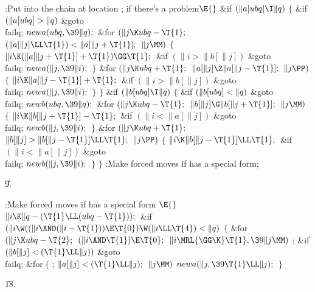 \Y\B\4:Put  into the chain at location ;  if there's a problem\X${}\E{}$\6
\&{if} ${}(\|a[\\{ubq}]\I\|q){}$\5
${}\{{}$\1\6
\&{if} ${}(\|a[\\{ubq}]>\|q){}$\1\5
\&{goto} \\{failq};\2\6
${}\\{newa}(\\{ubq},\39\|q);{}$\6
\&{for} ${}(\|j\K\\{ubq}-\T{1};{}$ ${}(\|a[\|j]\LL\T{1})<\|a[\|j+\T{1}];{}$ ${}%
\|j\MM){}$\5
${}\{{}$\1\6
${}\|i\K(\|a[\|j+\T{1}]+\T{1})\GG\T{1};{}$\6
\&{if} ${}(\|i>\|b[\|j]){}$\1\5
\&{goto} \\{failq};\2\6
${}\\{newa}(\|j,\39\|i);{}$\6
\4${}\}{}$\2\6
\&{for} ${}(\|j\K\\{ubq}+\T{1};{}$ ${}\|a[\|j]\Z\|a[\|j-\T{1}];{}$ ${}\|j%
\PP){}$\5
${}\{{}$\1\6
${}\|i\K\|a[\|j-\T{1}]+\T{1};{}$\6
\&{if} ${}(\|i>\|b[\|j]){}$\1\5
\&{goto} \\{failq};\2\6
${}\\{newa}(\|j,\39\|i);{}$\6
\4${}\}{}$\2\6
\4${}\}{}$\2\6
\&{if} ${}(\|b[\\{ubq}]\I\|q){}$\5
${}\{{}$\1\6
\&{if} ${}(\|b[\\{ubq}]<\|q){}$\1\5
\&{goto} \\{failq};\2\6
${}\\{newb}(\\{ubq},\39\|q);{}$\6
\&{for} ${}(\|j\K\\{ubq}-\T{1};{}$ ${}\|b[\|j]\G\|b[\|j+\T{1}];{}$ ${}\|j%
\MM){}$\5
${}\{{}$\1\6
${}\|i\K\|b[\|j+\T{1}]-\T{1};{}$\6
\&{if} ${}(\|i<\|a[\|j]){}$\1\5
\&{goto} \\{failq};\2\6
${}\\{newb}(\|j,\39\|i);{}$\6
\4${}\}{}$\2\6
\&{for} ${}(\|j\K\\{ubq}+\T{1};{}$ ${}\|b[\|j]>\|b[\|j-\T{1}]\LL\T{1};{}$ ${}%
\|j\PP){}$\5
${}\{{}$\1\6
${}\|i\K\|b[\|j-\T{1}]\LL\T{1};{}$\6
\&{if} ${}(\|i<\|a[\|j]){}$\1\5
\&{goto} \\{failq};\2\6
${}\\{newb}(\|j,\39\|i);{}$\6
\4${}\}{}$\2\6
\4${}\}{}$\2\6
:Make forced moves if  has a special form\X;\par
\U9.\fi

\B{}:Make forced moves if  has a special form%
\X${}\E{}$\6
$\|i\K\|q-(\T{1}\LL(\\{ubq}-\T{1}));{}$\6
\&{if} ${}(\|i\W((\|i\AND(\|i-\T{1}))\E\T{0})\W(\|i\LL\T{4})<\|q){}$\5
${}\{{}$\1\6
\&{for} ${}(\|j\K\\{ubq}-\T{2};{}$ ${}(\|i\AND\T{1})\E\T{0};{}$ ${}\|i\MRL{{%
\GG}{\K}}\T{1},\39\|j\MM){}$\1\5
;\2\6
\&{if} ${}(\|b[\|j]<(\T{1}\LL\|j)){}$\1\5
\&{goto} \\{failq};\2\6
\&{for} ( ; ${}\|a[\|j]<(\T{1}\LL\|j);{}$ ${}\|j\MM){}$\1\5
${}\\{newa}(\|j,\39\T{1}\LL\|j);{}$\2\6
\4${}\}{}$\2\par
\U18.\fi

